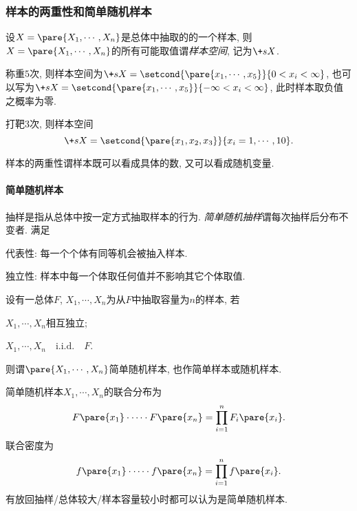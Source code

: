 \documentclass{ctexart}
\begin{document}

\subsubsection{样本的两重性和简单随机样本} %
\label{ssub:样本的两重性和简单随机样本}

设$X = \pare{X_1, \cdots, X_n}$是总体中抽取的的一个样本, 则$X=\pare{X_1,\cdots,X_n}$的所有可能取值谓\emph{样本空间}, 记为$\+sX$.
\begin{sample}
    \begin{ex}
        称重$5$次, 则样本空间为$\+sX = \setcond{\pare{x_1,\cdots,x_5}}{0<x_i<\infty}$, 也可以写为$\+sX = \setcond{\pare{x_1,\cdots,x_5}}{-\infty<x_i<\infty}$, 此时样本取负值之概率为零.
    \end{ex}
    \begin{ex}
        打靶$3$次, 则样本空间
        \[ \+sX = \setcond{\pare{x_1,x_2,x_3}}{x_i = 1,\cdots,10}. \]
    \end{ex}
\end{sample}
样本的两重性谓样本既可以看成具体的数, 又可以看成随机变量.

\paragraph{简单随机样本} %
\label{par:简单随机样本}

抽样是指从总体中按一定方式抽取样本的行为. \emph{简单随机抽样}谓每次抽样后分布不变者. 满足
\begin{cenum}
    \item 代表性: 每一个个体有同等机会被抽入样本.
    \item 独立性: 样本中每一个体取任何值并不影响其它个体取值.
\end{cenum}
\begin{definition}
    设有一总体$F$, $X_1,\cdots,X_n$为从$F$中抽取容量为$n$的样本, 若
    \begin{cenum}
        \item $X_1,\cdots,X_n$相互独立;
        \item $X_1,\cdots,X_n\quad \mathrm{i.i.d.} \quad F$.
    \end{cenum}
    则谓$\pare{X_1,\cdots,X_n}$简单随机样本, 也作简单样本或随机样本.
\end{definition}
简单随机样本$X_1, \cdots, X_n$的联合分布为
\[ F\pare{x_1}\cdot\cdots\cdot F\pare{x_n} = \prod_{i=1}^n F_i\pare{x_i}. \]
联合密度为
\[ f\pare{x_1}\cdot\cdots\cdot f\pare{x_n} = \prod_{i=1}^n f\pare{x_i}. \]
有放回抽样/总体较大/样本容量较小时都可以认为是简单随机样本.
\end{document}
